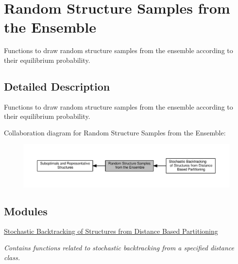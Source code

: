 \hypertarget{group__subopt__stochbt}{}\section{Random Structure Samples from the Ensemble}
\label{group__subopt__stochbt}


Functions to draw random structure samples from the ensemble according to their equilibrium probability.  




\subsection{Detailed Description}
Functions to draw random structure samples from the ensemble according to their equilibrium probability. 

Collaboration diagram for Random Structure Samples from the Ensemble\+:
\nopagebreak
\begin{figure}[H]
\begin{center}
\leavevmode
\includegraphics[width=350pt]{group__subopt__stochbt}
\end{center}
\end{figure}
\subsection*{Modules}
\begin{DoxyCompactItemize}
\item 
\hyperlink{group__kl__neighborhood__stochbt}{Stochastic Backtracking of Structures from Distance Based Partitioning}
\begin{DoxyCompactList}\small\item\em Contains functions related to stochastic backtracking from a specified distance class. \end{DoxyCompactList}\end{DoxyCompactItemize}
